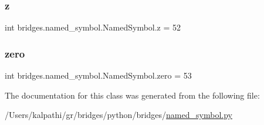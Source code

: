 \subsubsection{\texorpdfstring{z}{z}}
{\footnotesize\ttfamily int bridges.\+named\+\_\+symbol.\+Named\+Symbol.\+z = 52\hspace{0.3cm}{\ttfamily [static]}}

\mbox{\label{classbridges_1_1named__symbol_1_1_named_symbol_ab43d8d090ac4acfadeed3bd51eb254c2}} 
\subsubsection{\texorpdfstring{zero}{zero}}
{\footnotesize\ttfamily int bridges.\+named\+\_\+symbol.\+Named\+Symbol.\+zero = 53\hspace{0.3cm}{\ttfamily [static]}}



The documentation for this class was generated from the following file\+:\begin{DoxyCompactItemize}
\item 
/\+Users/kalpathi/gr/bridges/python/bridges/\mbox{\hyperlink{named__symbol_8py}{named\+\_\+symbol.\+py}}\end{DoxyCompactItemize}
